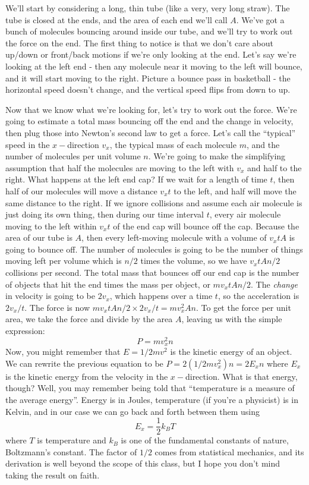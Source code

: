 \documentclass[letterpaper,11pt,preprint]{aastex}
\begin{document}
We'll start by considering a long, thin tube (like a very, very long
straw).  The tube is closed at the ends, and the area of each end
we'll call $A$.  We've got a bunch of molecules bouncing around inside
our tube, and we'll try to work out the force on the end.  The first
thing to notice is that we don't care about up/down or front/back
motions if we're only looking at the end.  Let's say we're looking at
the left end - then any molecule near it moving to the left will
bounce, and it will start moving to the right.  Picture a bounce pass
in basketball - the horizontal speed doesn't change, and the vertical
speed flips from down to up.

Now that we know what we're looking for, let's try to work out the
force.  We're going to estimate a total mass bouncing off the end and
the change in velocity, then plug those into Newton's second law to
get a force.  Let's call the ``typical'' speed in the $x-$direction $v_x$,
the typical mass of each molecule $m$, and the number of molecules per
unit volume $n$.  We're going to make the simplifying assumption that
half the molecules are moving to the left with $v_x$ and half to the
right.  What happens at the left end cap?  If we wait for a
length of time $t$, then half of our molecules will move a distance
$v_xt$ to the left, and half will move the same distance to the
right.  If we ignore collisions and assume each air molecule is just
doing its own thing, then during our time interval $t$, every air
molecule moving to the left within $v_xt$ of the end cap will bounce
off the cap.  Because the area of our  tube is $A$, then every
left-moving molecule with a volume of $v_xtA$ is going to bounce off.
The number of molecules is going to be the number of things moving
left per volume which is $n/2$ times the volume, so we have $v_x
tAn/2$ collisions per second.  The total mass that bounces off our end
cap is the number of objects that hit the end times the mass per object, or
$mv_xtAn/2$.  The \textit{change} in velocity is going to be $2v_x$,
which happens over a time $t$, so the acceleration is $2v_x/t$.  The
force is now $mv_xtAn/2 \times 2v_x/t = mv_x^2 An$.  To get the force
per unit area, we take the force and divide by the area $A$, leaving
us with the simple expression:
\begin{equation}
  P=mv_x^2 n
  \label{eqn:ideal_gas_kinetic}
\end{equation}
Now, you might remember that $E=1/2 mv^2$ is the kinetic energy of an
object.  We can rewrite the previous equation to be $P=2(1/2 mv_x^2) n
= 2E_x n$ where $E_x$ is the kinetic energy from the velocity in the
$x-$direction.  What is that energy, though?  Well, you may remember
being told that ``temperature is a measure of the average energy''.
Energy is in Joules, temperature (if you're a physicist) is in Kelvin,
and in our case we can go back and forth between them using
\begin{equation}
  E_x=\frac{1}{2}k_BT
  \label{eqn:Boltzmann}
\end{equation}
where $T$ is temperature and $k_B$ is one of the fundamental constants
of nature, Boltzmann's constant.  The factor of $1/2$ comes from
statistical mechanics, and its derivation is well beyond the scope of
this class, but I hope you don't mind taking the result on faith.
\end{document}
